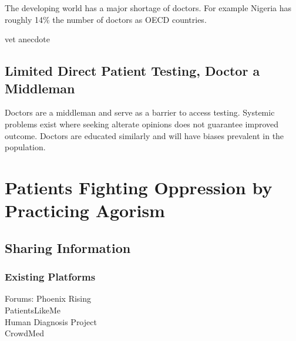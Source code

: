 \documentclass{article}
\begin{document}

The developing world has a major shortage of doctors. For example Nigeria has roughly 14\% the number of doctors as OECD countries. \cite{wef2014}


vet anecdote



\cite{ferguson2007patients}

\subsection{Limited Direct Patient Testing, Doctor a Middleman}

Doctors are a middleman and serve as a barrier to access testing. Systemic problems exist where seeking alterate opinions does not guarantee improved outcome. Doctors are educated similarly and will have biases prevalent in the population. 



\cite{CarsonDesktop}

\section{Patients Fighting Oppression by Practicing Agorism}

\subsection{Sharing Information}




\subsubsection{Existing Platforms}
Forums: Phoenix Rising\\
PatientsLikeMe\\
Human Diagnosis Project\\
CrowdMed\\
\end{document}
